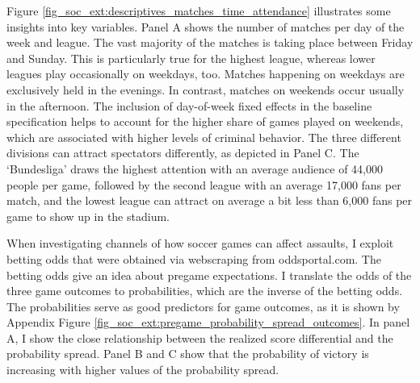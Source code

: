 \documentclass[11pt, a4paper]{article} %
\begin{document}

Figure \ref{fig_soc_ext:descriptives_matches_time_attendance} illustrates some insights into key variables. Panel A shows the number of matches per day of the week and league. The vast majority of the matches is taking place between Friday and Sunday. This is particularly true for the highest league, whereas lower leagues play occasionally on weekdays, too. Matches happening on weekdays are exclusively held in the evenings. In contrast, matches on weekends occur usually in the afternoon. The inclusion of day-of-week fixed effects in the baseline specification helps to account for the higher share of games played on weekends, which are associated with higher levels of criminal behavior. The three different divisions can attract spectators differently, as depicted in Panel C. The `Bundesliga' draws the highest attention with an average audience of 44,000 people per game, followed by the second league with an average 17,000 fans per match, and the lowest league can attract on average a bit less than 6,000 fans per game to show up in the stadium.

When investigating channels of how soccer games can affect assaults, I exploit betting odds that were obtained via webscraping from oddsportal.com. The betting odds give an idea about pregame expectations. I translate the odds of the three game outcomes to probabilities, which are the inverse of the betting odds. The probabilities serve as good predictors for game outcomes, as it is shown by Appendix Figure \ref{fig_soc_ext:pregame_probability_spread_outcomes}. In panel A, I show the close relationship between the realized score differential and the probability spread. Panel B and C show that the probability of victory is increasing with higher values of the probability spread. 
\end{document}
